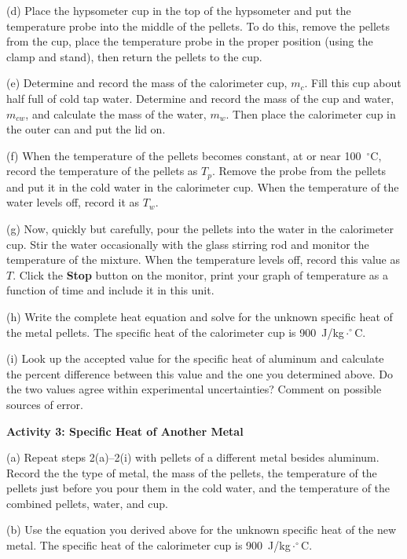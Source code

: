 (d) Place the hypsometer cup in the top of the hypsometer and put the temperature probe into the middle of the pellets.  To do this, remove the pellets from the cup, place the temperature probe in the proper position (using the clamp and stand), then return the pellets to the cup.

(e) Determine and record the mass of the calorimeter cup, $m_c$.
Fill this cup about half full of cold tap water. Determine and record
the mass of the cup and water, $m_{cw}$, and calculate the mass
of the water, $m_w$. Then place the calorimeter cup in the outer
can and put the lid on.
\vspace{15mm}

(f) When the temperature of the pellets becomes constant, at or near
100~$^{\circ }$C, record the temperature of the pellets as $T_{p}$.
Remove the probe from the pellets and put it in the cold water in the calorimeter cup. When the temperature of the water levels off, record it as $T_{w}$.
\vspace{15mm}

(g) Now, quickly but carefully, pour the pellets into the water in
the calorimeter cup. Stir the water occasionally with the glass stirring rod and
monitor the temperature of the mixture. When the temperature levels off, record
this value as $T$. Click the {\bf Stop} button on the monitor, print your graph of temperature as a function of time and include it in this unit.

(h) Write the complete heat equation and solve for the unknown specific
heat of the metal pellets.
The specific heat of the calorimeter cup is 900~J/kg$\cdot^{\circ}$C.
\answerspace{1.8in}

(i) Look up the accepted value for the specific heat of aluminum and
calculate the percent difference between this value and the one you
determined above. Do the two values agree within experimental uncertainties?
Comment on possible sources of error.
\answerspace{20mm}

\pagebreak[2]
\textbf{Activity 3: Specific Heat of Another Metal}

(a) Repeat steps 2(a)--2(i) with pellets of a different metal besides aluminum.
Record the the type of metal, the mass of the pellets, the temperature of the
pellets just before you pour them in the cold water, and the temperature of the
combined pellets, water, and cup.
\answerspace{15mm}

(b) Use the equation you derived above for the unknown specific
heat of the new metal. 
The specific heat of the calorimeter cup is 900~J/kg$\cdot^{\circ}$C.


